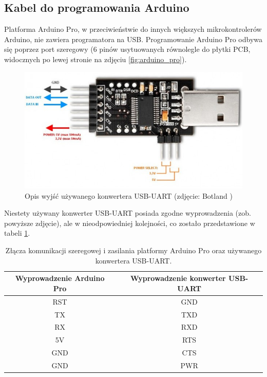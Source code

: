 \subsection{Kabel do programowania Arduino}
\label{subsec:kabel_do_programowania_arduino}

Platforma Arduino Pro, w przeciwieństwie do innych większych mikrokontrolerów Arduino, nie zawiera programatora na USB. Programowanie Arduino Pro odbywa się poprzez port szeregowy (6 pinów usytuowanych równolegle do płytki PCB, widocznych po lewej stronie na zdjęciu \ref{fig:arduino_pro}).

\begin{figure}[h]
	\centering
	\includegraphics[scale=0.5]{pics/konwerter-usb-uart-ft232-33-5v.jpg}
	\caption{\label{fig:arduino_ide}Opis wyjść używanego konwertera USB-UART (zdjęcie: Botland \cite{KonwerterBotland})}
\end{figure}

Niestety używany konwerter USB-UART posiada zgodne wyprowadzenia (zob. powyższe zdjęcie), ale w nieodpowiedniej kolejności, co zostało przedstawione w tabeli \ref{tab:piny}.

\begin{table}[h]
    \centering
    
    \begin{threeparttable}
        \caption{Złącza komunikacji szeregowej i zasilania platformy Arduino Pro oraz używanego konwertera USB-UART.}
        \label{tab:piny}
        
        \begin{tabular}{cc}
            \toprule
            Wyprowadzenie Arduino Pro & Wyprowadzenie konwerter USB-UART \\
            \midrule
            RST & GND \\
            TX & TXD \\
            RX & RXD \\
            5V & RTS \\
            GND & CTS \\
            GND & PWR \\
            \bottomrule
        \end{tabular}
        
    \end{threeparttable}
\end{table}

